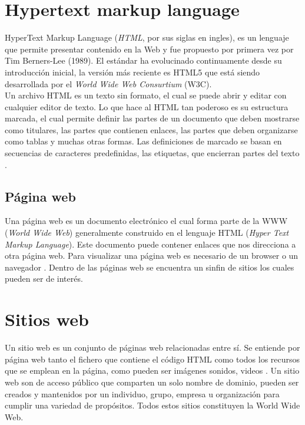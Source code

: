 
\section{Hypertext markup language}
HyperText Markup Language (\textit{HTML}, por sus siglas en ingles), 
es un lenguaje que permite presentar contenido en la Web y fue propuesto por primera vez por 
Tim Berners-Lee (1989). El estándar ha evolucinado continuamente desde su introducción inicial, 
la versión más reciente es HTML5 que está siendo desarrollada por el \textit{World Wide Web Consurtium} (W3C).
\\
Un archivo HTML es un texto sin formato, el cual se puede abrir y editar con cualquier editor de 
texto. Lo que hace al HTML tan poderoso es su estructura marcada, el cual permite definir las partes 
de un documento que deben mostrarse como titulares, las partes que contienen enlaces, las partes que deben 
organizarse como tablas y muchas otras formas. Las definiciones de marcado se basan en secuencias de caracteres 
predefinidas, las etiquetas, que encierran partes del texto \citep{CTHTML}. 


\subsection{Página web}

Una página web es un documento electrónico el cual forma parte de la WWW (\textit{World Wide Web}) generalmente 
construido en el lenguaje HTML (\textit{Hyper Text Markup Language}). Este documento puede contener enlaces que nos 
direcciona a otra página web. Para visualizar una página web es necesario de un browser o un navegador \citep{CT16}. 
Dentro de las páginas web se encuentra un sinfin de sitios los cuales pueden ser de interés.


\section{Sitios web}
Un sitio web es un conjunto de páginas web relacionadas entre sí. Se entiende por página web tanto el fichero 
que contiene el código HTML como todos los recursos que se emplean en la página, como pueden ser
imágenes sonidos, videos \citep{CTsW}.
Un sitio web son de acceso público que comparten un solo nombre de dominio, pueden ser creados y 
mantenidos por un individuo, grupo, empresa u organización para cumplir una variedad de propósitos. 
Todos estos sitios constituyen la World Wide Web. 

